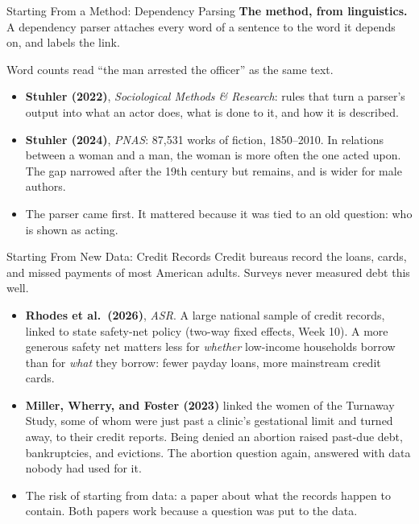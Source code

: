 \documentclass[aspectratio=169,11pt,xcolor=dvipsnames]{beamer}
\begin{document}
\begin{frame}{Starting From a Method: Dependency Parsing}
\textbf{The method, from linguistics.} A dependency parser attaches every word of a sentence to
the word it depends on, and labels the link.
\begin{center}
\end{center}
\vskip-8pt
Word counts read ``the man arrested the officer'' as the same text.
\begin{itemize}\itemsep2pt
  \item \textbf{Stuhler (2022)}, \textit{Sociological Methods \& Research}: rules that turn a
        parser's output into what an actor does, what is done to it, and how it is described.
  \item \textbf{Stuhler (2024)}, \textit{PNAS}: 87,531 works of fiction, 1850--2010. In
        relations between a woman and a man, the woman is more often the one acted upon. The
        gap narrowed after the 19th century but remains, and is wider for male authors.
  \item The parser came first. It mattered because it was tied to an old question: who is
        shown as acting.
\end{itemize}
\end{frame}

\begin{frame}{Starting From New Data: Credit Records}
Credit bureaus record the loans, cards, and missed payments of most American adults. Surveys never
measured debt this well.
\begin{itemize}\itemsep4pt
  \item \textbf{Rhodes et al.\ (2026)}, \textit{ASR}. A large national sample of credit records,
        linked to state safety-net policy (two-way fixed effects, Week 10). A more generous
        safety net matters less for \emph{whether} low-income households borrow than for
        \emph{what} they borrow: fewer payday loans, more mainstream credit cards.
  \item \textbf{Miller, Wherry, and Foster (2023)} linked the women of the Turnaway Study, some
        of whom were just past a clinic's gestational limit and turned away, to their credit
        reports. Being denied an abortion raised past-due debt, bankruptcies, and evictions.
        The abortion question again, answered with data nobody had used for it.
  \item The risk of starting from data: a paper about what the records happen to contain. Both
        papers work because a question was put to the data.
\end{itemize}
\end{frame}
\end{document}
